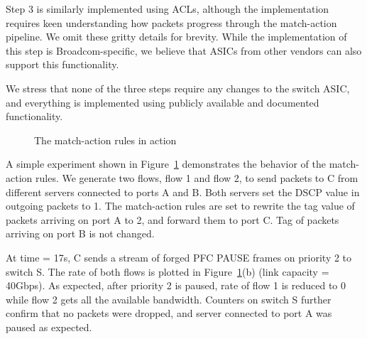 Step 3 is similarly implemented using ACLs, although the implementation requires
keen understanding how packets progress through the match-action pipeline. We
omit these gritty details for brevity. While the implementation of this step is
Broadcom-specific, we believe that ASICs from other vendors can also support
this functionality.

We stress that none of the three steps require any changes to the switch ASIC,
and everything is implemented using publicly available and documented
functionality.

\begin{figure}[t]
	\centering
	
	
	\caption{The match-action rules in action}\label{fig:tagger_demon}
\end{figure}


  A simple experiment shown in
Figure~\ref{fig:tagger_demon} demonstrates the behavior of the match-action
rules.  We generate two flows, flow 1 and flow 2, to send packets to C from
different servers connected to ports A and B. Both servers set the DSCP value in
outgoing packets to 1. The match-action rules are set to rewrite the tag value
of packets arriving on port A to 2, and forward them to port C. Tag of packets
arriving on port B is not changed.
 
At time = 17s, C sends a stream of forged PFC PAUSE frames on priority 2 to
switch S. The rate of both flows is plotted in Figure~\ref{fig:tagger_demon}(b)
(link capacity = 40Gbps). As expected, after priority 2 is paused, rate of
flow 1 is reduced to 0 while flow 2 gets all the available bandwidth. 
Counters on switch S further confirm that no packets were dropped, and server
connected to port A was paused as expected.
